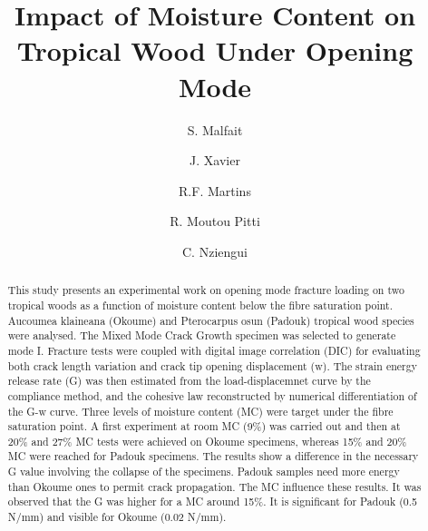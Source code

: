 \documentclass[3p,times,procedia]{elsarticle}
\begin{document}
\begin{frontmatter}



%

\title{Impact of Moisture Content on Tropical Wood Under Opening Mode}


\author[a]{S. Malfait}
\author[b]{J. Xavier}
\author[b]{R.F. Martins}
\author[a]{R. Moutou Pitti}
\author[a]{C. Nziengui}

\address[a]{Université Clermont Auvergne, Clermont Auvergne INP, Institut Pascal, Clermont-Ferrand, France}
\address[b]{UNIDEMI, Department of Mechanical and Industrial Engineering, NOVA School of Science and Technology, NOVA University Lisbon, 2829-516 Caparica, Portugal}

\begin{abstract}
This study presents an experimental work on opening mode fracture loading on
two tropical woods as a function of moisture content below the fibre saturation point. Aucoumea klaineana (Okoume) and Pterocarpus osun (Padouk)
tropical wood species were analysed. The Mixed Mode Crack Growth specimen was
selected to generate mode I. Fracture tests were coupled with digital image
correlation (DIC) for evaluating both crack length variation and crack tip
opening displacement (w). The strain energy release rate (G) was then estimated
from the load-displacemnet curve by the compliance method, and the cohesive
law reconstructed by numerical differentiation of the G-w curve. Three levels of moisture content (MC) were target under the fibre saturation point. A first experiment at room MC (9\%) was carried out and then at 20\% and 27\% MC tests were achieved on Okoume specimens, whereas 15\% and 20\% MC were reached for Padouk specimens. The results show a difference in the necessary G value involving the collapse of the specimens. Padouk samples need more energy than Okoume ones to permit crack propagation. The MC influence these results. It was observed that the G was higher for a MC around 15\%. It is significant for Padouk (0.5 N/mm) and visible for Okoume (0.02 N/mm).
\end{abstract}


\end{frontmatter}
\end{document}
